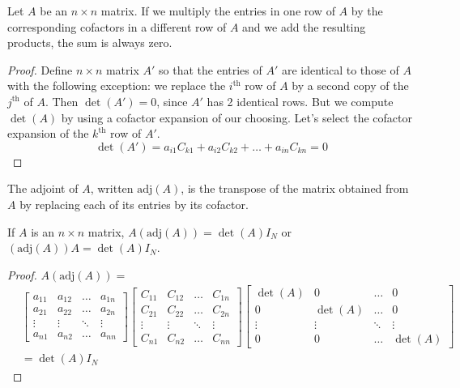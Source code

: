 \documentclass[12pt]{article}
\begin{document}
 \begin{theorem} Let $A$ be an $n \times n$ matrix. If we multiply the entries in one row of $A$ by the corresponding cofactors in a different row of $A$ and we add the resulting products, the sum is always zero. \end{theorem} 
 \begin{proof} Define $n \times n$ matrix $A'$ so that the entries of $A'$ are identical to those of $A$ with the following exception: we replace the $i^\text{th}$ row of $A$ by a second copy of the $j^\text{th}$ of $A$. Then $\det(A') = 0$, since $A'$ has 2 identical rows. But we compute $\det(A)$ by using a cofactor expansion of our choosing. Let's select the cofactor expansion of the $k^\text{th}$ row of $A'$. $$ \det(A') = a_{i1}C_{k1} + a_{i2}C_{k2} + \dots + a_{in}C_{kn} = 0$$ \end{proof} 
 The adjoint of $A$, written $\text{adj}(A)$, is the transpose of the matrix obtained from $A$ by replacing each of its entries by its cofactor. \newline
 \begin{theorem} If $A$ is an $n \times n$ matrix, $A(\text{adj}(A)) = \det(A)I_N$ or $(\text{adj}(A))A = \det(A)I_N$. \end{theorem} 
\begin{proof}  $A(\text{adj}(A)) = $ $$\begin{aligned} &\begin{bmatrix} a_{11} & a_{12} & \dots & a_{1n} \\ a_{21} & a_{22} & \dots & a_{2n} \\ \vdots & \vdots & \ddots & \vdots \\ a_{n1} & a_{n2} & \dots & a_{nn} \end{bmatrix} \begin{bmatrix} C_{11} & C_{12} & \dots & C_{1n} \\ C_{21} & C_{22} & \dots & C_{2n} \\ \vdots & \vdots & \ddots & \vdots \\ C_{n1} & C_{n2} & \dots & C_{nn} \end{bmatrix} \begin{bmatrix} \det(A) & 0 & \dots & 0 \\ 0 & \det(A) & \dots & 0 \\ \vdots & \vdots & \ddots & \vdots \\ 0 & 0 & \dots & \det(A) \end{bmatrix} \\ &= \det(A)I_N \end{aligned} $$  \end{proof} 
\end{document}
